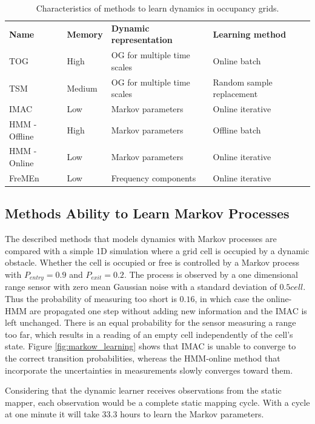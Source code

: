 \begin{table}[htbp]
    \centering
    \caption{Characteristics of methods to learn dynamics in occupancy grids.}
    \label{tab:learners_characteristics}
    \begin{tabular}{p{2.6cm} | p{1.6cm} | p{} | p{2.6cm}}
        \toprule
        \textbf{Name} & \textbf{Memory} & \textbf{Dynamic representation} & \textbf{Learning method}  \\
        \rowcolor[gray]{0.925}
        TOG & High & OG for multiple time scales & Online batch  \\
        TSM & Medium & OG for multiple time scales & Random sample replacement  \\
        \rowcolor[gray]{0.925}
        IMAC & Low & Markov parameters & Online iterative  \\
        HMM - Offline & High & Markov parameters & Offline batch  \\
        \rowcolor[gray]{0.925} 
        HMM - Online & Low & Markov parameters & Online iterative  \\
        FreMEn & Low & Frequency components & Online iterative \\
        \bottomrule
    \end{tabular}
\end{table}

\subsection{Methods Ability to Learn Markov Processes}
The described  methods that models dynamics with Markov processes are compared with a simple 1D simulation where a grid cell is occupied by a dynamic obstacle. 
Whether the cell is occupied or free is controlled by a Markov process with $P_{entry}=0.9$ and $P_{exit}=0.2$. 
The process is observed by a one dimensional range sensor with zero mean Gaussian noise with a standard deviation of $0.5cell$.
Thus the probability of measuring too short is $0.16$, in which case the online-HMM are propagated one step without adding new information and the IMAC is left unchanged.
There is an equal probability for the sensor measuring a range too far, which results in a reading of an empty cell independently of the cell's state. 
Figure \ref{fig:markow_learning} shows that IMAC is unable to converge to the correct transition probabilities, whereas the HMM-online method that incorporate the uncertainties in measurements slowly converges toward them.

Considering that the dynamic learner receives observations from the static mapper, each observation would be a complete static mapping cycle. With a cycle at one minute it will take $33.3$ hours to learn the Markov parameters. 
 
